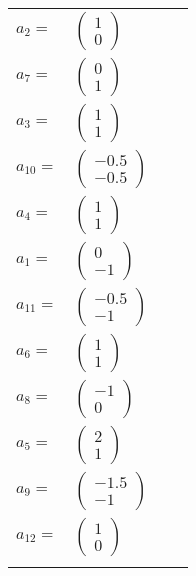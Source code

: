 \documentclass[1p]{elsarticle_modified}
\theoremstyle{definition}
\begin{document}
\begin{tabular}{m{7pt} m{180pt} m{7pt} m{180pt} }
\flushright $a_{2}=$&$\begin{pmatrix}1\\0\end{pmatrix}$ \\
\flushright $a_{7}=$&$\begin{pmatrix}0\\1\end{pmatrix}$ \\
\flushright $a_{3}=$&$\begin{pmatrix}1\\1\end{pmatrix}$ \\
\flushright $a_{10}=$&$\begin{pmatrix}-0.5\\-0.5\end{pmatrix}$ \\
\flushright $a_{4}=$&$\begin{pmatrix}1\\1\end{pmatrix}$ \\
\flushright $a_{1}=$&$\begin{pmatrix}0\\-1\end{pmatrix}$ \\
\flushright $a_{11}=$&$\begin{pmatrix}-0.5\\-1\end{pmatrix}$ \\
\flushright $a_{6}=$&$\begin{pmatrix}1\\1\end{pmatrix}$ \\
\flushright $a_{8}=$&$\begin{pmatrix}-1\\0\end{pmatrix}$ \\
\flushright $a_{5}=$&$\begin{pmatrix}2\\1\end{pmatrix}$ \\
\flushright $a_{9}=$&$\begin{pmatrix}-1.5\\-1\end{pmatrix}$ \\
\flushright $a_{12}=$&$\begin{pmatrix}1\\0\end{pmatrix}$\\&\end{tabular}
\end{document}
